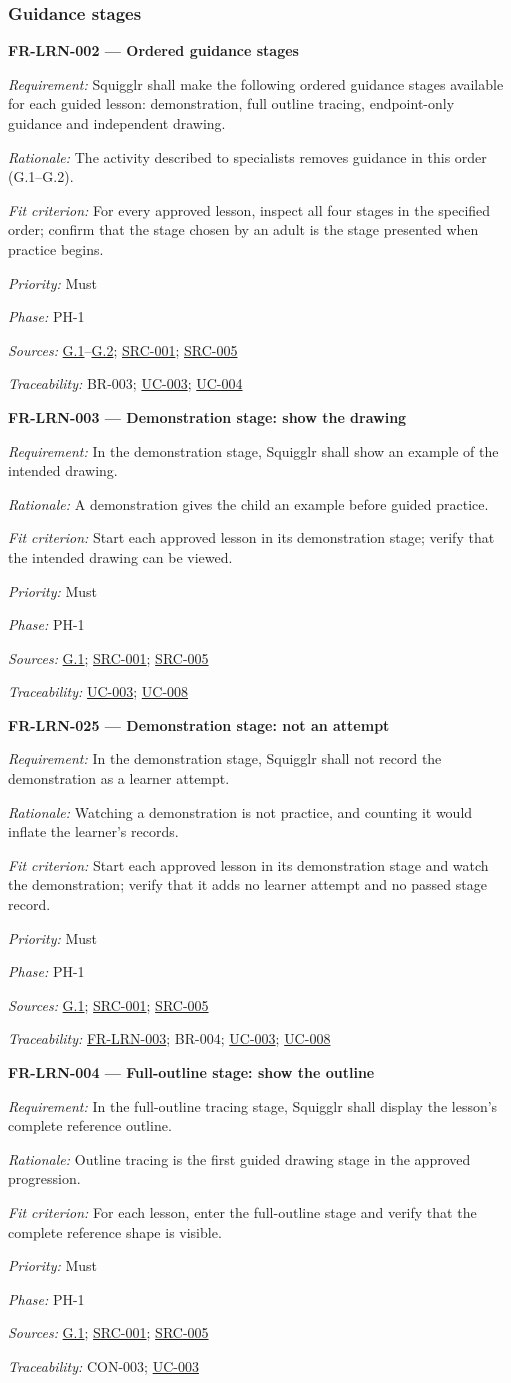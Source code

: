 \documentclass[12pt]{article}
\renewcommand{\_}{\textunderscore\allowbreak}%
\newcommand{\goalref}[1]{\hyperref[goal:#1]{G.#1}}
\newcommand{\ucref}[1]{\hyperref[uc:#1]{\mbox{UC-#1}}}
\newenvironment{srsrequirement}[2]{%
  \par\medskip\noindent\phantomsection\label{req:#1}%
  \textbf{#1 --- #2}\par\nobreak\smallskip }{\par\medskip}
\newcommand{\reqfield}[2]{\noindent\textit{#1:} #2\par}
\newcommand{\reqshall}[1]{\reqfield{Requirement}{#1}}
\newcommand{\reqrationale}[1]{\reqfield{Rationale}{#1}}
\newcommand{\reqfit}[1]{\reqfield{Fit criterion}{#1}}
\newcommand{\reqpriority}[1]{\reqfield{Priority}{#1}}
\newcommand{\reqphase}[1]{\reqfield{Phase}{#1}}
\newcommand{\reqsources}[1]{\reqfield{Sources}{#1}}
\newcommand{\reqtraces}[1]{\reqfield{Traceability}{#1}}
\newcommand{\reqref}[1]{\hyperref[req:#1]{#1}}
\newcommand{\srcref}[1]{\hyperref[src:#1]{SRC-#1}}
\providecommand{\ucref}[1]{\hyperref[uc:#1]{UC-#1}}
\begin{document}
\subsubsection{Guidance stages}
\begin{srsrequirement}{FR-LRN-002}{Ordered guidance stages}
  \reqshall{Squigglr shall make the following ordered guidance stages available
for each guided lesson: demonstration, full outline tracing, endpoint-only
guidance and independent drawing.} \reqrationale{The activity described to
specialists removes guidance in this order (G.1--G.2).} \reqfit{For every
approved lesson, inspect all four stages in the specified order; confirm that
the stage chosen by an adult is the stage presented when practice begins.}
  \reqpriority{Must}
  \reqphase{PH-1}
  \reqsources{\goalref{1}--\goalref{2}; \srcref{001}; \srcref{005}}
  \reqtraces{BR-003; \ucref{003}; \ucref{004}}
\end{srsrequirement}

\begin{srsrequirement}{FR-LRN-003}{Demonstration stage: show the drawing}
  \reqshall{In the demonstration stage, Squigglr shall show an example of the
intended drawing.} \reqrationale{A demonstration gives the child an example
before guided practice.} \reqfit{Start each approved lesson in its
demonstration stage; verify that the intended drawing can be viewed.}
  \reqpriority{Must}
  \reqphase{PH-1}
  \reqsources{\goalref{1}; \srcref{001}; \srcref{005}} \reqtraces{\ucref{003};
  \ucref{008}}
\end{srsrequirement}

\begin{srsrequirement}{FR-LRN-025}{Demonstration stage: not an attempt}
  \reqshall{In the demonstration stage, Squigglr shall not record the
demonstration as a learner attempt.} \reqrationale{Watching a demonstration is
not practice, and counting it would inflate the learner's records.}
\reqfit{Start each approved lesson in its demonstration stage and watch the
demonstration; verify that it adds no learner attempt and no passed stage
record.}
  \reqpriority{Must}
  \reqphase{PH-1}
  \reqsources{\goalref{1}; \srcref{001}; \srcref{005}}
  \reqtraces{\reqref{FR-LRN-003}; BR-004; \ucref{003}; \ucref{008}}
\end{srsrequirement}

\begin{srsrequirement}{FR-LRN-004}{Full-outline stage: show the outline}
  \reqshall{In the full-outline tracing stage, Squigglr shall display the
lesson's complete reference outline.} \reqrationale{Outline tracing is the first
guided drawing stage in the approved progression.} \reqfit{For each lesson,
enter the full-outline stage and verify that the complete reference shape is
visible.}
  \reqpriority{Must}
  \reqphase{PH-1}
  \reqsources{\goalref{1}; \srcref{001}; \srcref{005}} \reqtraces{CON-003;
  \ucref{003}}
\end{srsrequirement}
\end{document}
